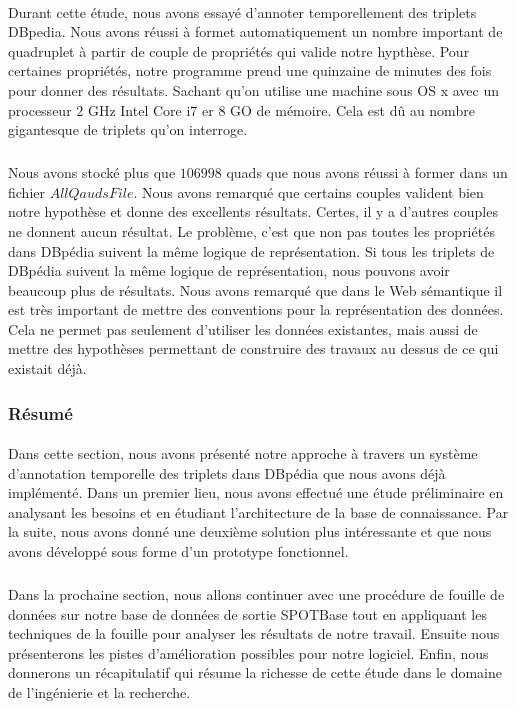 \documentclass[12pt,a4	]{report}
\begin{document}
\paragraph{}
Durant cette étude, nous avons essayé d'annoter temporellement des triplets DBpedia. Nous avons réussi à formet automatiquement un nombre important de quadruplet à partir de couple de propriétés qui valide notre hypthèse. Pour certaines propriétés, notre programme prend une quinzaine de minutes des fois pour donner des résultats. Sachant qu'on utilise une machine sous OS x avec un processeur $2$ GHz Intel Core i$7$ er $8$ GO de mémoire. Cela est dû au nombre gigantesque de triplets qu'on interroge.
\subparagraph{}
Nous avons stocké plus que $106998$ quads que nous avons réussi à former dans un fichier $AllQaudsFile$. Nous avons remarqué que certains couples valident bien notre hypothèse et donne des excellents résultats. Certes, il y a d'autres couples ne donnent aucun résultat. Le problème, c'est que non pas toutes les propriétés dans DBpédia suivent la même logique de représentation. Si tous les triplets de DBpédia suivent la même logique de représentation, nous pouvons avoir beaucoup plus de résultats.
Nous avons remarqué que dans le Web sémantique il est très important de mettre des conventions pour la représentation des données. Cela ne permet pas seulement d'utiliser les données existantes, mais aussi de mettre des hypothèses permettant de construire des travaux au dessus de ce qui existait déjà.
\subsubsection*{Résumé}
\paragraph{}
Dans cette section, nous avons présenté notre approche à travers un système d'annotation temporelle des triplets dans DBpédia que nous avons déjà implémenté. Dans un premier lieu, nous avons effectué une étude préliminaire en analysant les besoins et en étudiant l'architecture de la base de connaissance.
Par la suite, nous avons donné une deuxième solution plus intéressante et que nous avons développé  sous forme d'un prototype fonctionnel.
\subparagraph{}
Dans la prochaine section, nous allons continuer avec une procédure de fouille de données sur notre base de données de sortie SPOTBase tout en appliquant les techniques de la fouille pour analyser les résultats de notre travail. Ensuite nous présenterons les pistes d'amélioration possibles pour notre logiciel. Enfin, nous donnerons un récapitulatif qui résume la richesse de cette étude dans le domaine de l'ingénierie et la recherche.

\end{document}
